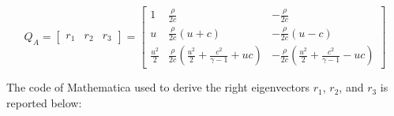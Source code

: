 \begin{equation}
    Q_A = \begin{bmatrix}
        r_1 & r_2 & r_3
    \end{bmatrix} = \begin{bmatrix}
        1             & \frac{\rho}{2c}                                                & - \frac{\rho}{2c}                                                \\
        u             & \frac{\rho}{2c} (u + c)                                        & - \frac{\rho}{2c} (u - c)                                        \\
        \frac{u^2}{2} & \frac{\rho}{2c} (\frac{u^2}{2} + \frac{c^2}{\gamma - 1} + u c) & - \frac{\rho}{2c} (\frac{u^2}{2} + \frac{c^2}{\gamma - 1} - u c)
    \end{bmatrix}
    \label{eq:matrix_Q_A}
\end{equation}

The code of Mathematica used to derive the right eigenvectors $r_1$, $r_2$, and $r_3$ is reported below:




